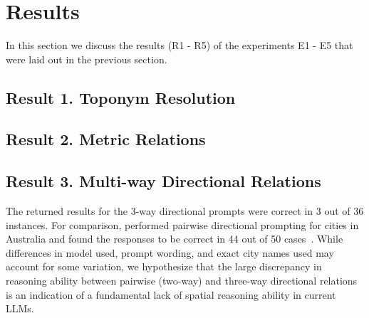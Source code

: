 \section{Results}
\label{section:results}

In this section we discuss the results (R1 - R5) of the experiments E1 - E5 that were laid out in the previous section.


\subsection{Result 1. Toponym Resolution}







\subsection{Result 2. Metric Relations}




\subsection{Result 3. Multi-way Directional Relations}
The returned results for the 3-way directional prompts were correct in 3 out of 36 instances.
For comparison, \citeauthor{Qi2023} performed pairwise directional prompting for cities in Australia and found the responses to be correct in 44 out of 50 cases~\cite{Qi2023}.
While differences in model used, prompt wording, and exact city names used may account for some variation, we hypothesize that the large discrepancy in reasoning ability between pairwise (two-way) and three-way directional relations is an indication of a fundamental lack of spatial reasoning ability in current LLMs.

